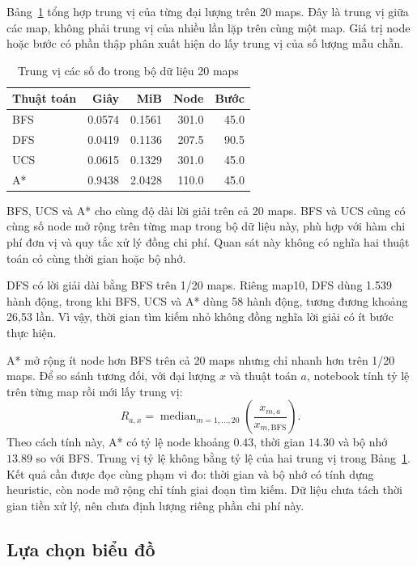 Bảng~\ref{tab:benchmark_medians} tổng hợp trung vị của từng đại lượng
trên 20 maps. Đây là trung vị giữa các map, không phải trung vị của
nhiều lần lặp trên cùng một map. Giá trị node hoặc bước có phần thập
phân xuất hiện do lấy trung vị của số lượng mẫu chẵn.

\begin{table}[htbp]
    \centering
    \caption{Trung vị các số đo trong bộ dữ liệu 20 maps}
    \label{tab:benchmark_medians}
    \small
    \begin{tabular}{@{}lrrrr@{}}
        \toprule
        \textbf{Thuật toán} & \textbf{Giây} & \textbf{MiB} &
        \textbf{Node} & \textbf{Bước} \\
        \midrule
        BFS & 0.0574 & 0.1561 & 301.0 & 45.0 \\
        DFS & 0.0419 & 0.1136 & 207.5 & 90.5 \\
        UCS & 0.0615 & 0.1329 & 301.0 & 45.0 \\
        A*  & 0.9438 & 2.0428 & 110.0 & 45.0 \\
        \bottomrule
    \end{tabular}
\end{table}

BFS, UCS và A* cho cùng độ dài lời giải trên cả 20 maps. BFS và UCS
cũng có cùng số node mở rộng trên từng map trong bộ dữ liệu này, phù
hợp với hàm chi phí đơn vị và quy tắc xử lý đồng chi phí. Quan sát này
không có nghĩa hai thuật toán có cùng thời gian hoặc bộ nhớ.

DFS có lời giải dài bằng BFS trên 1/20 maps. Riêng map10, DFS dùng
1.539 hành động, trong khi BFS, UCS và A* dùng 58 hành động, tương
đương khoảng 26,53 lần. Vì vậy, thời gian tìm kiếm nhỏ không đồng nghĩa
lời giải có ít bước thực hiện.

A* mở rộng ít node hơn BFS trên cả 20 maps nhưng chỉ nhanh hơn trên
1/20 maps. Để so sánh tương đối, với đại lượng $x$ và thuật toán $a$,
notebook tính tỷ lệ trên từng map rồi mới lấy trung vị:
\[
    R_{a,x}=\operatorname{median}_{m=1,\ldots,20}
    \left(\frac{x_{m,a}}{x_{m,\mathrm{BFS}}}\right).
\]
Theo cách tính này, A* có tỷ lệ node khoảng $0.43$, thời gian $14.30$
và bộ nhớ $13.89$ so với BFS. Trung vị tỷ lệ không bằng tỷ lệ của hai
trung vị trong Bảng~\ref{tab:benchmark_medians}. Kết quả cần được đọc
cùng phạm vi đo: thời gian và bộ nhớ có tính dựng heuristic, còn node
mở rộng chỉ tính giai đoạn tìm kiếm. Dữ liệu chưa tách thời gian tiền
xử lý, nên chưa định lượng riêng phần chi phí này.

\subsection{Lựa chọn biểu đồ}

